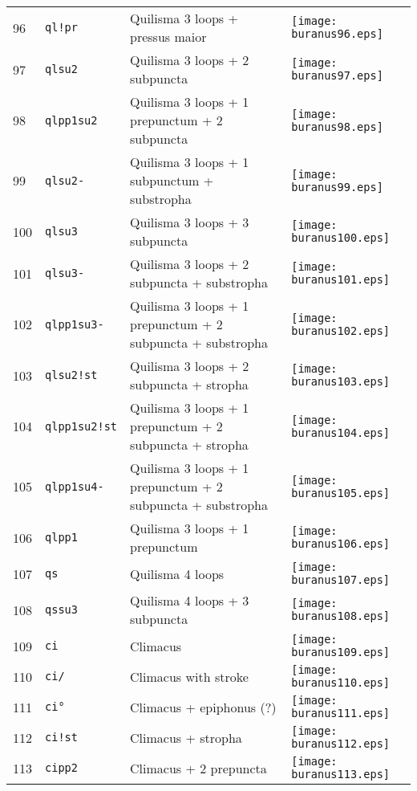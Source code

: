 \documentclass{scrarticle}
\begin{document}
\begin{longtable}{l|l|l|l}
96 & \texttt{ql!pr} & Quilisma 3 loops + pressus maior & \texttt{[image: buranus96.eps]} \\
97 & \texttt{qlsu2} & Quilisma 3 loops + 2 subpuncta & \texttt{[image: buranus97.eps]} \\
98 & \texttt{qlpp1su2} & Quilisma 3 loops + 1 prepunctum + 2 subpuncta & \texttt{[image: buranus98.eps]} \\
99 & \texttt{qlsu2-} & Quilisma 3 loops + 1 subpunctum + substropha & \texttt{[image: buranus99.eps]} \\
100 & \texttt{qlsu3} & Quilisma 3 loops + 3 subpuncta & \texttt{[image: buranus100.eps]} \\
101 & \texttt{qlsu3-} & Quilisma 3 loops + 2 subpuncta + substropha & \texttt{[image: buranus101.eps]} \\
102 & \texttt{qlpp1su3-} & Quilisma 3 loops + 1 prepunctum + 2 subpuncta + substropha & \texttt{[image: buranus102.eps]} \\
103 & \texttt{qlsu2!st} & Quilisma 3 loops + 2 subpuncta + stropha & \texttt{[image: buranus103.eps]} \\
104 & \texttt{qlpp1su2!st} & Quilisma 3 loops + 1 prepunctum + 2 subpuncta + stropha & \texttt{[image: buranus104.eps]} \\
105 & \texttt{qlpp1su4-} & Quilisma 3 loops + 1 prepunctum + 2 subpuncta + substropha & \texttt{[image: buranus105.eps]} \\
106 & \texttt{qlpp1} & Quilisma 3 loops + 1 prepunctum & \texttt{[image: buranus106.eps]} \\
107 & \texttt{qs} & Quilisma 4 loops & \texttt{[image: buranus107.eps]} \\
108 & \texttt{qssu3} & Quilisma 4 loops + 3 subpuncta & \texttt{[image: buranus108.eps]} \\
109 & \texttt{ci} & Climacus & \texttt{[image: buranus109.eps]} \\
110 & \texttt{ci/} & Climacus with stroke & \texttt{[image: buranus110.eps]} \\
111 & \texttt{ci°} & Climacus + epiphonus (?) & \texttt{[image: buranus111.eps]} \\
112 & \texttt{ci!st} & Climacus + stropha & \texttt{[image: buranus112.eps]} \\
113 & \texttt{cipp2} & Climacus + 2 prepuncta & \texttt{[image: buranus113.eps]} \\

\end{longtable}
\end{document}
